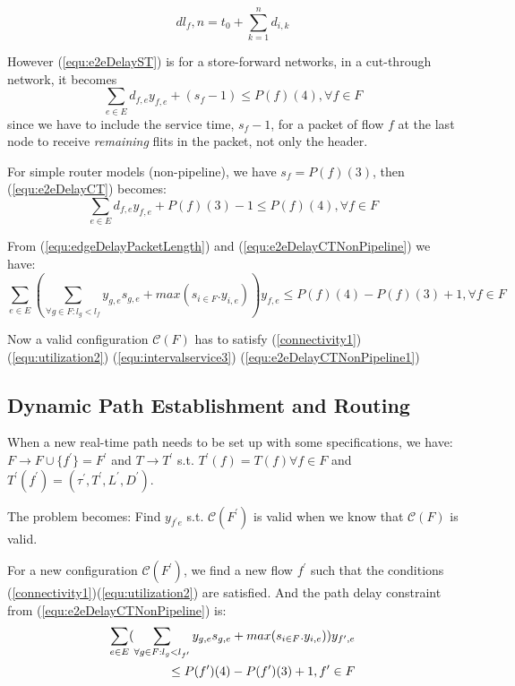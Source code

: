 \documentclass[conference, twocolumn]{IEEEtran}
\theoremstyle{definition}
\begin{document}
\begin{equation}\label{equ:deadline2}
dl_f,n=t_0 + \sum_{k=1}^{n}d_{i,k}
\end{equation}

However (\ref{equ:e2eDelayST}) is for a store-forward networks, in a
cut-through network, it becomes
\begin{equation}\label{equ:e2eDelayCT}
\sum_{e \in E}d_{f,e}y_{f,e} + (s_f - 1) \leq P(f)(4), \forall f \in F
\end{equation}
since we have to include the service time, $s_f-1$, for a packet of flow $f$ at
the last node to receive {\em remaining} flits in the packet, not only the
header.

For simple router models (non-pipeline), we have $s_f = P(f)(3)$, then
(\ref{equ:e2eDelayCT}) becomes:
\begin{equation}\label{equ:e2eDelayCTNonPipeline}
\sum_{e \in E}d_{f,e}y_{f,e} + P(f)(3) - 1 \leq P(f)(4), \forall f \in F
\end{equation}

From (\ref{equ:edgeDelayPacketLength}) and (\ref{equ:e2eDelayCTNonPipeline}) we have:
\begin{equation}\label{equ:e2eDelayCTNonPipeline1}
\sum_{e \in E} (\sum_{\forall g \in F:l_g <
l_{f}}y_{g,e}s_{g,e}+max(s_{i \in F}.y_{i,e}))y_{f,e} \leq P(f)(4)-P(f)(3) + 1,
\forall f \in F
\end{equation}

Now a valid configuration $\mathcal{C}(F)$ has to satisfy (\ref{connectivity1}) 
(\ref{equ:utilization2})
(\ref{equ:intervalservice3}) (\ref{equ:e2eDelayCTNonPipeline1})

\subsection{Dynamic Path Establishment and Routing}
When a new real-time path needs to be set up with some specifications, we have:
$F \rightarrow F \cup \{f^{'} \}=F^{'}$
and $T \rightarrow T^{'}$ s.t. $T^{'} (f)=T(f)\forall f \in F$ and $T^{'}
(f^{'})=(\tau ^{'}, T^{'}, L^{'}, D^{'})$.

The problem becomes: Find $y_{f^{'}e}$ s.t. $\mathcal{C}(F^{'})$ is valid
when we know that $\mathcal{C}(F)$ is valid.

For a new configuration $\mathcal{C}(F^{'})$, we find a new flow $f^{'}$ such that
the conditions (\ref{connectivity1})(\ref{equ:utilization2}) are satisfied. And
the path delay constraint from (\ref{equ:e2eDelayCTNonPipeline}) is:
\begin{eqnarray}\label{equ:e2eDelayNewPath}
\sum_{e \in E} (\sum_{\forall g \in F:l_g <
l_{f'}}y_{g,e}s_{g,e}+max(s_{i \in F}.y_{i,e}))y_{f',e} \notag \\
	\leq P(f')(4)-P(f')(3)
+ 1, f' \in F
\end{eqnarray}
\end{document}

